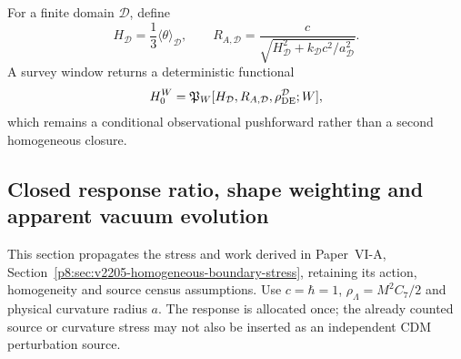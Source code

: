 \documentclass[12pt,a4paper]{article}
\begin{document}
For a finite domain \(\mathcal D\), define
\[
H_{\mathcal D}=\frac13\langle\theta\rangle_{\mathcal D},
\qquad
R_{A,\mathcal D}
=\frac{c}{\sqrt{H_{\mathcal D}^2+k_{\mathcal D}c^2/a_{\mathcal D}^2}}.
\]
A survey window returns a deterministic functional
\begin{equation}
\label{p9:eq:windowed-H0-clean}
H_0^W=\mathfrak P_W[H_{\mathcal D},R_{A,\mathcal D},
\rho_{\rm DE}^{\mathcal D};W],
\end{equation}
which remains a conditional observational pushforward rather than a second
homogeneous closure.

\subsection{Closed response ratio, shape weighting and apparent vacuum evolution}
\label{p9:sec:v2205-closed-response-readout}

This section propagates the stress and work derived in Paper~VI-A,
Section~\ref{p8:sec:v2205-homogeneous-boundary-stress}, retaining its
action, homogeneity and source census assumptions. Use $c=\hbar=1$,
$\rho_\Lambda=M^2C_7/2$ and physical curvature radius $a$.
The response is allocated once; the already counted source or curvature
stress may not also be inserted as an independent CDM perturbation source.
\end{document}
